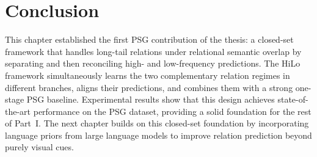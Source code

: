 \section{Conclusion}

This chapter established the first PSG contribution of the thesis: a closed-set framework that handles long-tail relations under relational semantic overlap by separating and then reconciling high- and low-frequency predictions.
The HiLo framework simultaneously learns the two complementary relation regimes in different branches, aligns their predictions, and combines them with a strong one-stage PSG baseline.
Experimental results show that this design achieves state-of-the-art performance on the PSG dataset, providing a solid foundation for the rest of Part~I.
The next chapter builds on this closed-set foundation by incorporating language priors from large language models to improve relation prediction beyond purely visual cues.
